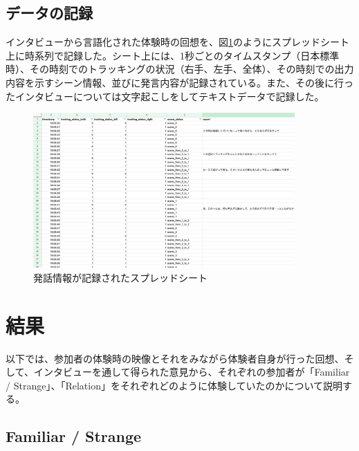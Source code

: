 \subsection{データの記録}
インタビューから言語化された体験時の回想を、図\ref{fig:spreadsheet}のようにスプレッドシート上に時系列で記録した。シート上には、1秒ごとのタイムスタンプ（日本標準時）、その時刻でのトラッキングの状況（右手、左手、全体）、その時刻での出力内容を示すシーン情報、並びに発言内容が記録されている。また、その後に行ったインタビューについては文字起こしをしてテキストデータで記録した。
\begin{figure}[H]
  \centering
  \includegraphics[width=10cm]{img/spreadsheet.png}
  \caption{発話情報が記録されたスプレッドシート}
  \label{fig:spreadsheet}
\end{figure}

\section{結果}
以下では、参加者の体験時の映像とそれをみながら体験者自身が行った回想、そして、インタビューを通して得られた意見から、それぞれの参加者が「Familiar / Strange」、「Relation」をそれぞれどのように体験していたのかについて説明する。

\subsection{Familiar / Strange}
